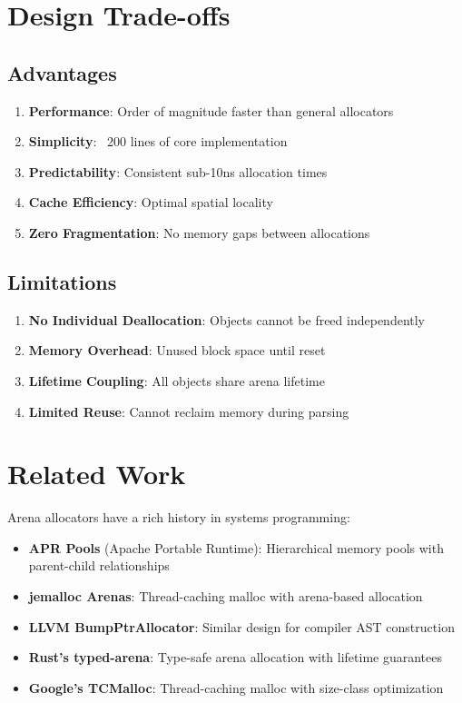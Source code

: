 \documentclass[11pt,a4paper]{article}
\begin{document}
\section{Design Trade-offs}

\subsection{Advantages}

\begin{enumerate}
    \item \textbf{Performance}: Order of magnitude faster than general allocators
    \item \textbf{Simplicity}: ~200 lines of core implementation
    \item \textbf{Predictability}: Consistent sub-10ns allocation times
    \item \textbf{Cache Efficiency}: Optimal spatial locality
    \item \textbf{Zero Fragmentation}: No memory gaps between allocations
\end{enumerate}

\subsection{Limitations}

\begin{enumerate}
    \item \textbf{No Individual Deallocation}: Objects cannot be freed independently
    \item \textbf{Memory Overhead}: Unused block space until reset
    \item \textbf{Lifetime Coupling}: All objects share arena lifetime
    \item \textbf{Limited Reuse}: Cannot reclaim memory during parsing
\end{enumerate}

\section{Related Work}

Arena allocators have a rich history in systems programming:

\begin{itemize}
    \item \textbf{APR Pools} (Apache Portable Runtime): Hierarchical memory pools with parent-child relationships
    \item \textbf{jemalloc Arenas}: Thread-caching malloc with arena-based allocation
    \item \textbf{LLVM BumpPtrAllocator}: Similar design for compiler AST construction
    \item \textbf{Rust's typed-arena}: Type-safe arena allocation with lifetime guarantees
    \item \textbf{Google's TCMalloc}: Thread-caching malloc with size-class optimization
\end{itemize}
\end{document}
